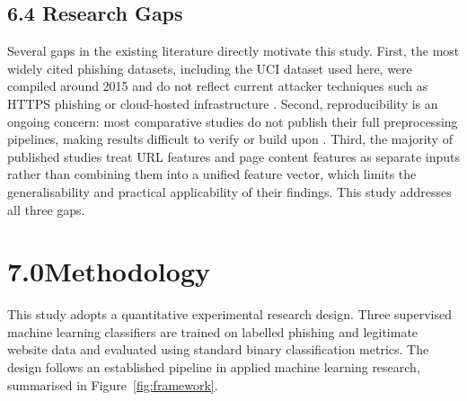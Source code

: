 \documentclass[11pt,letterpaper]{article}
\begin{document}
\subsection*{6.4 Research Gaps}

Several gaps in the existing literature directly motivate this study. First, the most widely cited phishing datasets, including the UCI dataset used here, were compiled around 2015 and do not reflect current attacker techniques such as HTTPS phishing or cloud-hosted infrastructure \cite{han2022}. Second, reproducibility is an ongoing concern: most comparative studies do not publish their full preprocessing pipelines, making results difficult to verify or build upon \cite{gundersen2018}. Third, the majority of published studies treat URL features and page content features as separate inputs rather than combining them into a unified feature vector, which limits the generalisability and practical applicability of their findings. This study addresses all three gaps.

\newpage
\section*{7.0\quad Methodology}

This study adopts a quantitative experimental research design. Three supervised machine learning classifiers are trained on labelled phishing and legitimate website data and evaluated using standard binary classification metrics. The design follows an established pipeline in applied machine learning research, summarised in Figure~\ref{fig:framework}.
\end{document}
